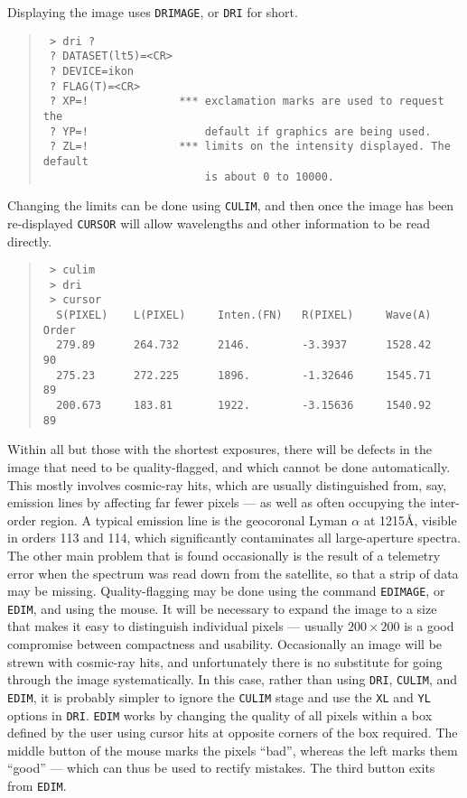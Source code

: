 Displaying the image uses {\tt DRIMAGE}, or {\tt DRI} for short. 
\begin{quote}
\begin{verbatim}
 > dri ?
 ? DATASET(lt5)=<CR>
 ? DEVICE=ikon
 ? FLAG(T)=<CR>
 ? XP=!              *** exclamation marks are used to request the
 ? YP=!                  default if graphics are being used. 
 ? ZL=!              *** limits on the intensity displayed. The default 
                         is about 0 to 10000. 
\end{verbatim}
\end{quote}
Changing the limits can be done using {\tt CULIM}, and then once the image
has been re-displayed {\tt CURSOR} will allow wavelengths and other information
to be read directly. 
\begin{quote}
\begin{verbatim}
 > culim
 > dri
 > cursor
  S(PIXEL)    L(PIXEL)     Inten.(FN)   R(PIXEL)     Wave(A)      Order
  279.89      264.732      2146.        -3.3937      1528.42      90
  275.23      272.225      1896.        -1.32646     1545.71      89
  200.673     183.81       1922.        -3.15636     1540.92      89
\end{verbatim}
\end{quote}
Within all but those with the shortest exposures, there will be defects
in the image that need to be quality-flagged, and which cannot be done
automatically. This mostly involves cosmic-ray hits, which are usually 
distinguished from, say, emission lines by affecting far fewer pixels ---
as well as often occupying the inter-order region. A typical emission line
is the geocoronal Lyman $\alpha$ at 1215{\AA}, visible in orders 113 and 114, 
which significantly contaminates all large-aperture spectra. 
The other main problem that is found occasionally is the 
result of a telemetry error when the spectrum was read down from the 
satellite, so that a strip of data may be missing. Quality-flagging may be done 
using the command {\tt EDIMAGE}, or {\tt EDIM}, and using the mouse. It will 
be necessary to expand the image to a size that makes it easy to distinguish
individual pixels --- usually $200\times 200$ is a good compromise between
compactness and usability. Occasionally an image will be strewn with cosmic-ray
hits, and unfortunately there is no substitute for going through the image 
systematically. In this case, rather than using {\tt DRI}, {\tt CULIM},
and {\tt EDIM}, it is probably simpler to ignore the {\tt CULIM} stage and
use the {\tt XL} and {\tt YL} options in {\tt DRI}. {\tt EDIM} works by 
changing the quality of all pixels within a box defined by the user using
cursor hits at opposite corners of the box required. The middle button of 
the mouse marks the pixels ``bad'', whereas the left marks them ``good'' ---
which can thus be used to rectify mistakes. The third button exits from 
{\tt EDIM}. 

